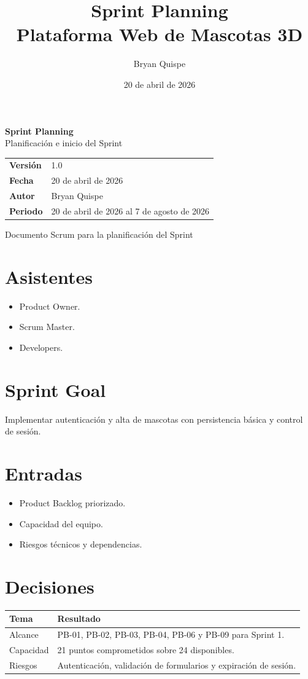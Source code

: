 \documentclass[12pt,a4paper]{article}
\title{\Huge\textbf{Sprint Planning}\\[0.3em]\Large Plataforma Web de Mascotas 3D}
\author{Bryan Quispe}
\date{20 de abril de 2026}
\begin{document}
\begin{titlepage}
\centering
\vspace*{1.8cm}
{\Huge\bfseries\color{PrimaryBlue} Sprint Planning\\[0.35em]}
{\LARGE Planificación e inicio del Sprint\\[1.2cm]}

\begin{tabular}{p{5cm} p{8cm}}
\rowcolor{SoftGray}
\textbf{Versión} & 1.0 \\
\textbf{Fecha} & 20 de abril de 2026 \\
\textbf{Autor} & Bryan Quispe \\
\textbf{Periodo} & 20 de abril de 2026 al 7 de agosto de 2026 \\
\end{tabular}

\vfill
{\large Documento Scrum para la planificación del Sprint}
\end{titlepage}

\section{Asistentes}
\begin{itemize}[leftmargin=*]
    \item Product Owner.
    \item Scrum Master.
    \item Developers.
\end{itemize}

\section{Sprint Goal}
Implementar autenticación y alta de mascotas con persistencia básica y control de sesión.

\section{Entradas}
\begin{itemize}[leftmargin=*]
    \item Product Backlog priorizado.
    \item Capacidad del equipo.
    \item Riesgos técnicos y dependencias.
\end{itemize}

\section{Decisiones}
\begin{longtable}{p{4cm} p{9cm}}
\toprule
\textbf{Tema} & \textbf{Resultado} \\
\midrule
Alcance & PB-01, PB-02, PB-03, PB-04, PB-06 y PB-09 para Sprint 1. \\
Capacidad & 21 puntos comprometidos sobre 24 disponibles. \\
Riesgos & Autenticación, validación de formularios y expiración de sesión. \\
\bottomrule
\end{longtable}
\end{document}
